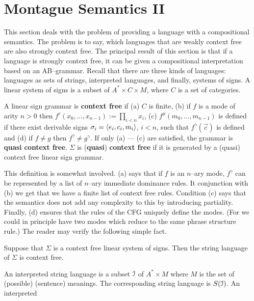 \section{Montague Semantics II}
\label{kap6-2}
%
%
%
This section deals with the problem of providing a language with a 
compositional semantics. The problem is to say, which languages that 
are weakly context free are also strongly context free. The principal 
result of this section is that if a language is strongly context free, 
it can be given a compositional interpretation based on an AB--grammar. 
Recall that there are three kinds of languages: languages as sets of 
strings, interpreted languages, and finally, systems of signs. A linear 
system of signs is a subset of $A^{\ast} \times C \times M$, where $C$ 
is a set of categories.
\begin{defn}
\label{defn:cfsg}
A linear sign grammar is \textbf{context free} if (a) $C$
is finite, (b) if $f$ is a mode of arity $n > 0$ then 
$f^{\varepsilon}(x_0,\dotsc,x_{n-1}) := \prod_{i< n} x_i$, 
(c) $f^{\mu}(m_0, \dotsc, m_{n-1})$ is defined if there exist
derivable signs $\sigma_i= \langle e_i, c_i, m_i\rangle$, $i < n$, such
that $f^{\gamma}(\vec{c})$ is defined and (d) if 
$f \neq g$ then $f^{\gamma} \neq g^{\gamma}$. If only (a) --- 
(c) are satisfied, the grammar is \textbf{quasi context free}. 
$\Sigma$ is (\textbf{quasi}) \textbf{context free} if it is 
generated by a (quasi) context free linear sign grammar.
\end{defn}
This definition is somewhat involved. (a) says that if $f$
is an $n$--ary mode, $f^{\gamma}$ can be represented by a list of
$n$--ary immediate dominance rules. It conjunction with (b)
we get that we have a finite list of context free rules. Condition
(c) says that the semantics does not add any complexity to this
by introducing partiality. Finally, (d) ensures that the rules
of the CFG uniquely define the modes. (For we could in principle 
have two modes which reduce to the same phrase structure rule.) 
The reader may verify the following simple fact.
\begin{prop}
Suppose that $\Sigma$ is a context free linear system of signs.
Then the string language of $\Sigma$ is context free.
\end{prop}
An interpreted string language is a subset $\mathcal{I}$ of $A^{\ast} 
\times M$ where $M$ is the set of (possible) (sentence) meanings. 
The corresponding string language is $S(\mathcal{I})$. An interpreted 
